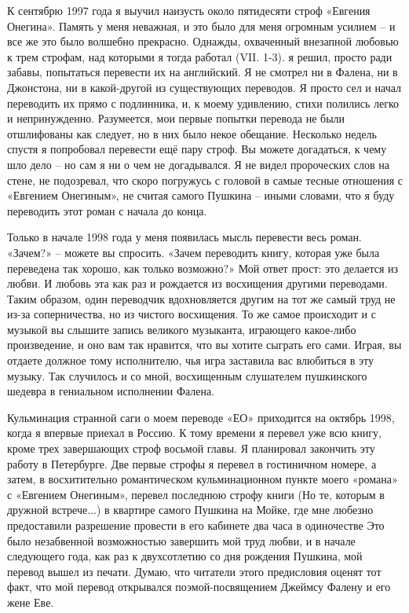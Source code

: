\documentclass[../main.tex]{subfiles}
\begin{document}
К сентябрю 1997 года я выучил наизусть около пятидесяти строф «Евгения Онегина».
Память у меня неважная, и это было для меня огромным усилием \--- и все же это было волшебно прекрасно.
Однажды, охваченный внезапной любовью к трем строфам, над которыми я тогда работал (VII. 1-3).
я решил, просто ради забавы, попытаться перевести их на английский.
Я не смотрел ни в Фалена, ни в Джонстона, ни в какой-другой из существующих переводов.
Я просто сел и начал переводить их прямо с подлинника, и, к моему удивлению, стихи полились легко и непринужденно.
Разумеется, мои первые попытки перевода не были отшлифованы как следует, но в них было некое обещание.
Несколько недель спустя я попробовал перевести ещё пару строф.
Вы можете догадаться, к чему шло дело \--- но сам я ни о чем не догадывался.
Я не видел пророческих слов на стене, не подозревал, что скоро погружусь с головой в самые тесные отношения с «Евгением Онегиным», не считая самого Пушкина \--- иными словами, что я буду переводить этот роман с начала до конца.

Только в начале 1998 года у меня появилась мысль перевести весь роман.
«Зачем?» \--- можете вы спросить.
«Зачем переводить книгу, которая уже была переведена так хорошо, как только возможно?» Мой ответ прост: это делается из любви.
И любовь эта как раз и рождается из восхищения другими переводами.
Таким образом, один переводчик вдохновляется другим на тот же самый труд не из-за соперничества, но из чистого восхищения.
То же самое происходит и с музыкой вы слышите запись великого музыканта, играющего какое-либо произведение, и оно вам так нравится, что вы хотите сыграть его сами.
Играя, вы отдаете должное тому исполнителю, чья игра заставила вас влюбиться в эту музыку.
Так случилось и со мной, восхищенным слушателем пушкинского шедевра в гениальном исполнении Фалена.

Кульминация странной саги о моем переводе «ЕО» приходится на октябрь 1998, когда я впервые приехал в Россию.
К тому времени я перевел уже всю книгу, кроме трех завершающих строф восьмой главы.
Я планировал закончить эту работу в Петербурге.
Две первые строфы я перевел в гостиничном номере, а затем, в восхитительно романтическом кульминационном пункте моего «романа» с «Евгением Онегиным», перевел последнюю строфу книги (Но те, которым в дружной встрече...) в квартире самого Пушкина на Мойке, где мне любезно предоставили разрешение провести в его кабинете два часа в одиночестве Это было незабвенной возможностью завершить мой труд любви, и в начале следующего года, как раз к двухсотлетию со дня рождения Пушкина, мой перевод вышел из печати.
Думаю, что читатели этого предисловия оценят тот факт, что мой перевод открывался поэмой-посвящением Джеймсу Фалену и его жене Еве.
\end{document}
